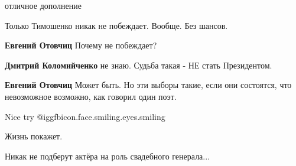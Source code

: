 \begin{itemize}
\begin{itemize} %
отличное дополнение

Только Тимошенко никак не побеждает. Вообще. Без шансов.

\textbf{Евгений Отовчиц} Почему не побеждает?

\textbf{Дмитрий Коломийченко} не знаю. Судьба такая - НЕ стать Президентом.

\textbf{Евгений Отовчиц} Может быть. Но эти выборы такие, если они состоятся, что невозможное возможно, как говорил один поэт.

Nice try @igg{fbicon.face.smiling.eyes.smiling} 
\end{itemize} %

Жизнь покажет.

Никак не подберут актёра на роль свадебного генерала...

\end{itemize} %
